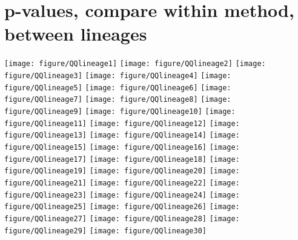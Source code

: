 \documentclass{article}\usepackage[]{graphicx}\usepackage[]{color}
\newenvironment{knitrout}{}{} %
\begin{document}
\section*{p-values, compare within method, between lineages}
\begin{knitrout}
\color{fgcolor}
\texttt{[image: figure/QQlineage1]} 
\texttt{[image: figure/QQlineage2]} 
\texttt{[image: figure/QQlineage3]} 
\texttt{[image: figure/QQlineage4]} 
\texttt{[image: figure/QQlineage5]} 
\texttt{[image: figure/QQlineage6]} 
\texttt{[image: figure/QQlineage7]} 
\texttt{[image: figure/QQlineage8]} 
\texttt{[image: figure/QQlineage9]} 
\texttt{[image: figure/QQlineage10]} 
\texttt{[image: figure/QQlineage11]} 
\texttt{[image: figure/QQlineage12]} 
\texttt{[image: figure/QQlineage13]} 
\texttt{[image: figure/QQlineage14]} 
\texttt{[image: figure/QQlineage15]} 
\texttt{[image: figure/QQlineage16]} 
\texttt{[image: figure/QQlineage17]} 
\texttt{[image: figure/QQlineage18]} 
\texttt{[image: figure/QQlineage19]} 
\texttt{[image: figure/QQlineage20]} 
\texttt{[image: figure/QQlineage21]} 
\texttt{[image: figure/QQlineage22]} 
\texttt{[image: figure/QQlineage23]} 
\texttt{[image: figure/QQlineage24]} 
\texttt{[image: figure/QQlineage25]} 
\texttt{[image: figure/QQlineage26]} 
\texttt{[image: figure/QQlineage27]} 
\texttt{[image: figure/QQlineage28]} 
\texttt{[image: figure/QQlineage29]} 
\texttt{[image: figure/QQlineage30]} 

\end{knitrout}

\end{document}
